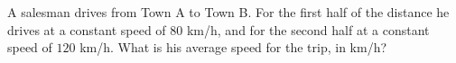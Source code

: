 A salesman drives from Town A to Town B. For the first half of the distance he drives at a constant speed of $80$ km/h, and for the second half at a constant speed of $120$ km/h. What is his average speed for the trip, in km/h?
